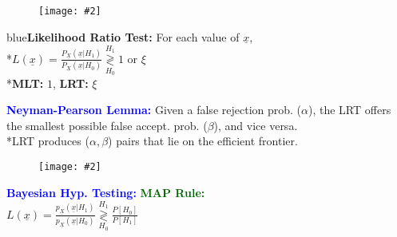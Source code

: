 \documentclass[5pt]{extarticle} %
\newcommand{\customFigure}[3][]{
    \vspace{-2em}
    \begin{figure}[H]
        \centering
        \texttt{[image: \#2]}
    \end{figure}
    \vspace{-2em}
}
\begin{document}
\begin{paracol}{3}
{    \customFigure[0.11]{../Images/TB_1.png}

    \textcolor{blue}{\textbf{Likelihood Ratio Test:}} For each value of $\underline{x}$, \\
    *$L(\underline{x}) = \frac{P_{\underline{X}} (\underline{x}|H_1)}{P_{\underline{X}} (\underline{x}|H_0)} \overset{H_1}{\underset{H_0}{\gtrless}} 1 \text{ or } \xi$ \\
    *\textbf{MLT:} $1$, \textbf{LRT:} $\xi$

    \textcolor{blue}{\textbf{Neyman-Pearson Lemma:}} Given a false rejection prob. ($\alpha$), the LRT offers the smallest possible false accept. prob. ($\beta$), and vice versa. \\
    *LRT produces ($\alpha,\beta$) pairs that lie on the efficient frontier.

    \customFigure[0.1]{../Images/L10_0.png}{}
    


    \textcolor{blue}{\textbf{Bayesian Hyp. Testing:}} \textcolor{darkgreen}{\textbf{MAP Rule:}} \\ 
    $L(\underline{x}) = \frac{p_{\underline{X}} (\underline{x} | H_1)}{p_{\underline{X}} (\underline{x} | H_0)} \overset{H_1}{\underset{H_0}{\gtrless}} \frac{P[H_0]}{P[H_1]}$ 
    
    

}
\end{paracol}
\end{document}
